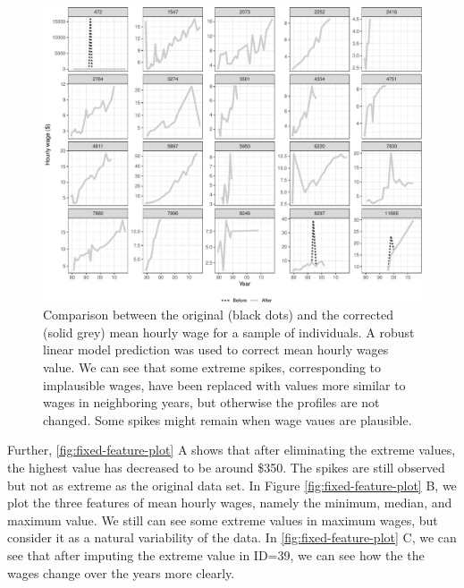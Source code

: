 \documentclass{article}
\begin{document}
\begin{figure}

{\centering \includegraphics[width=1\linewidth]{figures/compare-plot-1} 

}

\caption{Comparison between the original (black dots) and the corrected (solid grey) mean hourly wage for a sample of individuals. A robust linear model prediction was used to correct mean hourly wages value. We can see that some extreme spikes, corresponding to implausible wages, have been replaced with values more similar to wages in neighboring years, but otherwise the profiles are not changed. Some spikes might remain when wage vaues are plausible.}\label{fig:compare-plot}
\end{figure}

Further, \ref{fig:fixed-feature-plot} A shows that after eliminating the extreme values, the highest value has decreased to be around \$350. The spikes are still observed but not as extreme as the original data set. In Figure \ref{fig:fixed-feature-plot} B, we plot the three features of mean hourly wages, namely the minimum, median, and maximum value. We still can see some extreme values in maximum wages, but consider it as a natural variability of the data. In \ref{fig:fixed-feature-plot} C, we can see that after imputing the extreme value in ID=39, we can see how the the wages change over the years more clearly.
\end{document}

